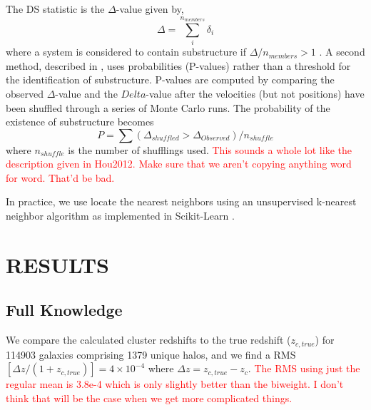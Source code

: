 \documentclass[apj, revtex4]{emulateapj}
\newcommand{\editorial}[1]{\textcolor{red}{#1} }
\begin{document}
The DS statistic is the $\Delta$-value given by, 
\begin{equation}
	\Delta = \sum^{n_{members}}_i \delta_i
\end{equation}
where a system is considered to contain substructure if $\Delta/n_{members} > 1$ \citep{Dressler1988}. A second method, described in \cite{Hou2012}, uses probabilities (P-values) rather than a threshold for the identification of substructure. P-values are computed by comparing the observed $\Delta$-value and the $Delta$-value after the velocities (but not positions) have been shuffled through a series of Monte Carlo runs. The probability of the existence of substructure becomes
\begin{equation}
	P = \sum (\Delta_{shuffled} > \Delta_{Observed}) / n_{shuffle}
\end{equation}
where $n_{shuffle}$ is the number of shufflings used. \editorial{This sounds a whole lot like the description given in Hou2012. Make sure that we aren't copying anything word for word. That'd be bad.}

In practice, we use locate the nearest neighbors using an unsupervised k-nearest neighbor algorithm as implemented in Scikit-Learn \citep{Pedregosa2012}. 

\section{RESULTS}

\subsection{Full Knowledge}
We compare the calculated cluster redshifts to the true redshift ($z_{c,true}$) for 114903 galaxies comprising 1379 unique halos, and we find a RMS$[\Delta z/(1+z_{c,true})]= 4\times 10^{-4}$ where $\Delta z = z_{c,true} - z_{c}$. \editorial{The RMS using just the regular mean is 3.8e-4 which is only slightly better than the biweight. I don't think that will be the case when we get more complicated things.}
\end{document}
